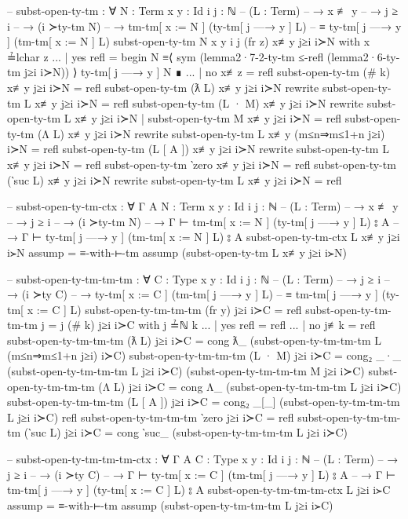 \documentclass[logo,bsc,singlespacing,parskip,online]{infthesis}
\begin{document}
\begin{code}
  -- subst-open-ty-tm : ∀ {N : Term} {x y : Id} {i j : ℕ}
  --   (L : Term)
  --   → x ≢ y
  --   → j ≥ i
  --   → (i ≻ty-tm N)
  --   → tm-tm[ x := N ] (ty-tm[ j —→ y ] L)
  --     ≡ ty-tm[ j —→ y ] (tm-tm[ x := N ] L)
  subst-open-ty-tm {N} {x} {y} {i} {j} (fr z) x≢y j≥i i≻N with x ≟lchar z
  ... | yes refl =
    begin
      N
    ≡⟨ sym (lemma2·7-2-ty-tm ≤-refl (lemma2·6-ty-tm j≥i i≻N)) ⟩
      ty-tm[ j —→ y ] N
    ∎
  ... | no  x≢z  = refl
  subst-open-ty-tm (# k) x≢y j≥i i≻N = refl
  subst-open-ty-tm (ƛ L) x≢y j≥i i≻N
    rewrite subst-open-ty-tm L x≢y j≥i i≻N = refl
  subst-open-ty-tm (L · M) x≢y j≥i i≻N
    rewrite subst-open-ty-tm L x≢y j≥i i≻N
    | subst-open-ty-tm M x≢y j≥i i≻N
    = refl
  subst-open-ty-tm (Λ L) x≢y j≥i i≻N
    rewrite subst-open-ty-tm L x≢y (m≤n⇒m≤1+n j≥i) i≻N = refl
  subst-open-ty-tm (L [ A ]) x≢y j≥i i≻N
    rewrite subst-open-ty-tm L x≢y j≥i i≻N = refl
  subst-open-ty-tm ‵zero x≢y j≥i i≻N = refl
  subst-open-ty-tm (‵suc L) x≢y j≥i i≻N rewrite
    subst-open-ty-tm L x≢y j≥i i≻N = refl

  -- subst-open-ty-tm-ctx : ∀ {Γ A} {N : Term} {x y : Id} {i j : ℕ}
  --   (L : Term)
  --   → x ≢ y
  --   → j ≥ i
  --   → (i ≻ty-tm N)
  --   → Γ ⊢ tm-tm[ x := N ] (ty-tm[ j —→ y ] L) ⦂ A
  --   → Γ ⊢ ty-tm[ j —→ y ] (tm-tm[ x := N ] L) ⦂ A
  subst-open-ty-tm-ctx L x≢y j≥i i≻N assump = ≡-with-⊢-tm assump (subst-open-ty-tm L x≢y j≥i i≻N)

  -- subst-open-ty-tm-tm-tm : ∀ {C : Type} {x y : Id} {i j : ℕ}
  --   (L : Term)
  --   → j ≥ i
  --   → (i ≻ty C)
  --   → ty-tm[ x := C ] (tm-tm[ j —→ y ] L)
  --     ≡ tm-tm[ j —→ y ] (ty-tm[ x := C ] L)
  subst-open-ty-tm-tm-tm (fr y) j≥i i≻C = refl
  subst-open-ty-tm-tm-tm {j = j} (# k) j≥i i≻C with j ≟ℕ k
  ... | yes refl = refl
  ... | no  j≢k  = refl
  subst-open-ty-tm-tm-tm (ƛ L) j≥i i≻C = cong ƛ_
    (subst-open-ty-tm-tm-tm L (m≤n⇒m≤1+n j≥i) i≻C)
  subst-open-ty-tm-tm-tm (L · M) j≥i i≻C = cong₂ _·_
    (subst-open-ty-tm-tm-tm L j≥i i≻C)
    (subst-open-ty-tm-tm-tm M j≥i i≻C)
  subst-open-ty-tm-tm-tm (Λ L) j≥i i≻C = cong Λ_
    (subst-open-ty-tm-tm-tm L j≥i i≻C)
  subst-open-ty-tm-tm-tm (L [ A ]) j≥i i≻C = cong₂ _[_]
    (subst-open-ty-tm-tm-tm L j≥i i≻C)
    refl
  subst-open-ty-tm-tm-tm ‵zero j≥i i≻C = refl
  subst-open-ty-tm-tm-tm (‵suc L) j≥i i≻C = cong ‵suc_
    (subst-open-ty-tm-tm-tm L j≥i i≻C)

  -- subst-open-ty-tm-tm-tm-ctx : ∀ {Γ A} {C : Type} {x y : Id} {i j : ℕ}
  --   (L : Term)
  --   → j ≥ i
  --   → (i ≻ty C)
  --   → Γ ⊢ ty-tm[ x := C ] (tm-tm[ j —→ y ] L) ⦂ A
  --   → Γ ⊢ tm-tm[ j —→ y ] (ty-tm[ x := C ] L) ⦂ A
  subst-open-ty-tm-tm-tm-ctx L j≥i i≻C assump = ≡-with-⊢-tm assump (subst-open-ty-tm-tm-tm L j≥i i≻C)


\end{code}
\end{document}
